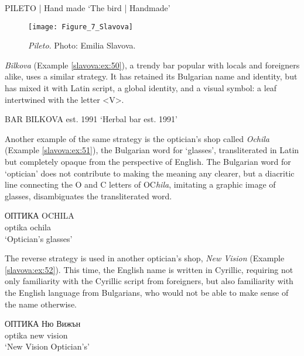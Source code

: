 \documentclass[output=paper]{langscibook}
\begin{document}
\begin{exe}
  \ex\label{slavova:ex:49} PILETO | Hand made
  \glt ‘The bird | Handmade’
\end{exe}

\begin{figure}
  \texttt{[image: Figure\_7\_Slavova]}
  \caption{\textit{Pileto}. Photo: Emilia Slavova.}
  \label{slavova:fig:7}
\end{figure}

\noindent
\textit{Bilkova}  (Example \ref{slavova:ex:50}), a trendy bar popular with locals and foreigners alike, uses a similar strategy. It has retained its Bulgarian name and identity, but has mixed it with Latin script, a global identity, and a visual symbol: a leaf intertwined with the letter <V>.

\begin{exe}
  \ex\label{slavova:ex:50} BAR BILKOVA est. 1991
  \glt ‘Herbal bar est. 1991’
\end{exe}


Another example of the same strategy is the optician’s shop called \textit{Ochila}
(Example \ref{slavova:ex:51}), the Bulgarian word for ‘glasses’, transliterated in Latin but completely opaque from the perspective of English. The Bulgarian word for ‘optician’ does not contribute to making the meaning any clearer, but a diacritic line connecting the O and C letters of OC\textit{hila}, %
imitating a graphic image of glasses, disambiguates the transliterated word.

\begin{exe}
  \ex\label{slavova:ex:51}
  \gll ОПТИКА OCHILA \\
  optika ochila \\
  \glt ‘Optician’s glasses’
\end{exe}


The reverse strategy is used in another optician’s shop, \textit{New Vision} (Example \ref{slavova:ex:52}). This time, the English name is written in Cyrillic, requiring not only familiarity with the Cyrillic script from foreigners, but also familiarity with the English language from Bulgarians, who would not be able to make sense of the name otherwise.

\begin{exe}
  \ex\label{slavova:ex:52}
  \gll ОПТИКА Ню Вижън \\
  optika new vision \\
  \glt ‘New Vision Optician’s’
\end{exe}
\end{document}
